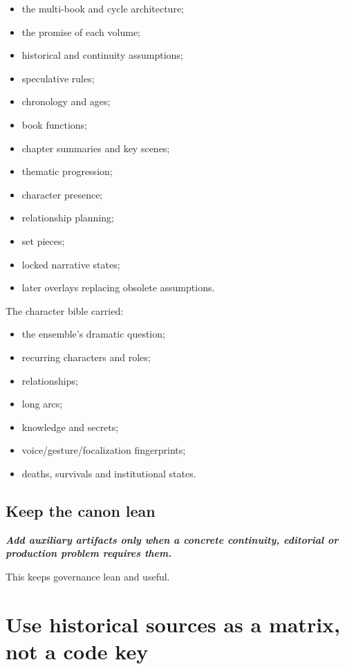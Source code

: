 \documentclass[11pt,oneside,openany]{book}
\renewenvironment{quote}{\begin{insightbox}\itshape}{\end{insightbox}}
\providecommand{\tightlist}{%
  \setlength{\itemsep}{0pt}\setlength{\parskip}{0pt}}
\begin{document}
\begin{itemize}
\tightlist
\item
  the multi-book and cycle architecture;
\item
  the promise of each volume;
\item
  historical and continuity assumptions;
\item
  speculative rules;
\item
  chronology and ages;
\item
  book functions;
\item
  chapter summaries and key scenes;
\item
  thematic progression;
\item
  character presence;
\item
  relationship planning;
\item
  set pieces;
\item
  locked narrative states;
\item
  later overlays replacing obsolete assumptions.
\end{itemize}

The character bible carried:

\begin{itemize}
\tightlist
\item
  the ensemble's dramatic question;
\item
  recurring characters and roles;
\item
  relationships;
\item
  long arcs;
\item
  knowledge and secrets;
\item
  voice/gesture/focalization fingerprints;
\item
  deaths, survivals and institutional states.
\end{itemize}

\section{Keep the canon lean}\label{keep-the-canon-lean}

\begin{quote}
\textbf{Add auxiliary artifacts only when a concrete continuity, editorial or production problem requires them.}
\end{quote}

This keeps governance lean and useful.

\chapter{Use historical sources as a matrix, not a code key}
\end{document}
